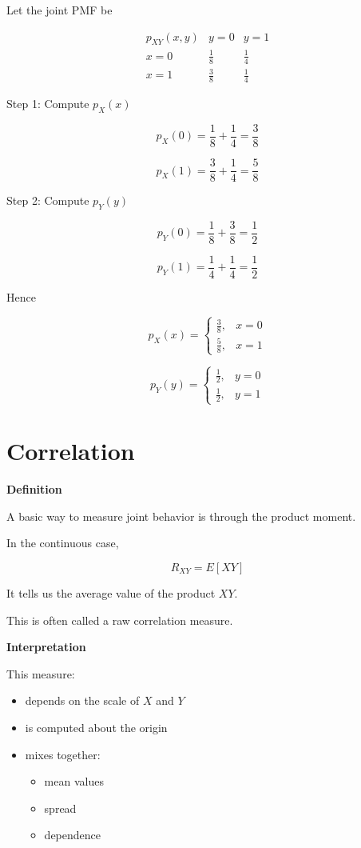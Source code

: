 \documentclass{article}
\begin{document}
Let the joint PMF be

\[
\begin{array}{c|cc}
p_{XY}(x,y) & y=0 & y=1 \\
\hline
x=0 & \frac{1}{8} & \frac{1}{4} \\
x=1 & \frac{3}{8} & \frac{1}{4}
\end{array}
\]

Step 1: Compute $p_X(x)$

\[
p_X(0)=\frac{1}{8}+\frac{1}{4}=\frac{3}{8}
\]

\[
p_X(1)=\frac{3}{8}+\frac{1}{4}=\frac{5}{8}
\]

Step 2: Compute $p_Y(y)$

\[
p_Y(0)=\frac{1}{8}+\frac{3}{8}=\frac{1}{2}
\]

\[
p_Y(1)=\frac{1}{4}+\frac{1}{4}=\frac{1}{2}
\]

Hence

\[
p_X(x)=
\begin{cases}
\frac{3}{8}, & x=0 \\
\frac{5}{8}, & x=1
\end{cases}
\]

\[
p_Y(y)=
\begin{cases}
\frac{1}{2}, & y=0 \\
\frac{1}{2}, & y=1
\end{cases}
\]

\section{Correlation}

\textbf{Definition}

A basic way to measure joint behavior is through the product moment.

In the continuous case,

\[
R_{XY} = E[XY]
\]

It tells us the average value of the product $XY$.

This is often called a raw correlation measure.

\textbf{Interpretation}

This measure:

\begin{itemize}
\item depends on the scale of $X$ and $Y$
\item is computed about the origin
\item mixes together:
\begin{itemize}
\item mean values
\item spread
\item dependence
\end{itemize}
\end{itemize}
\end{document}
